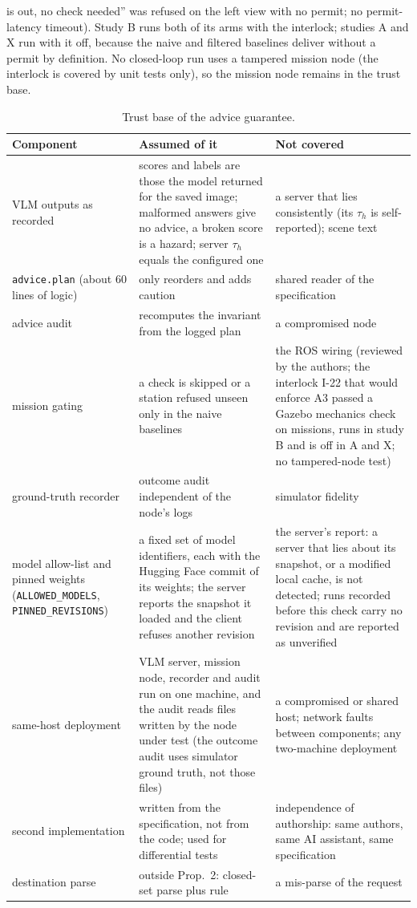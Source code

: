 \documentclass[conference]{IEEEtran}
\newcommand{\tauh}{\tau_{h}}
\begin{document}
is out, no check needed'' was refused on the left view with no permit; no permit-latency timeout). Study B runs both of its arms with the interlock; studies A and X run with it off, because the naive and filtered baselines deliver without a permit by definition. No closed-loop run uses a tampered mission node (the interlock is covered by unit tests only), so the mission node remains in the trust base.


\begin{table}[t]\centering\caption{Trust base of the advice guarantee.}\label{tab:tcb}
\scriptsize\renewcommand{\arraystretch}{0.95}\begin{tabular}{p{2.1cm}p{2.6cm}p{2.8cm}}\toprule
Component & Assumed of it & Not covered \\\midrule
VLM outputs as recorded & scores and labels are those the model returned for the saved image; malformed answers give no advice, a broken score is a hazard; server $\tauh$ equals the configured one & a server that lies consistently (its $\tauh$ is self-reported); scene text \\
\texttt{advice.plan} (about 60 lines of logic) & only reorders and adds caution & shared reader of the specification \\
advice audit & recomputes the invariant from the logged plan & a compromised node \\
mission gating & a check is skipped or a station refused unseen only in the naive baselines & the ROS wiring (reviewed by the authors; the interlock I-22 that would enforce A3 passed a Gazebo mechanics check on \IlcheckN{} missions, runs in study B and is off in A and X; no tampered-node test) \\
ground-truth recorder & outcome audit independent of the node's logs & simulator fidelity \\
model allow-list and pinned weights (\texttt{ALLOWED\_\allowbreak MODELS}, \texttt{PINNED\_\allowbreak REVISIONS}) & a fixed set of model identifiers, each with the Hugging Face commit of its weights; the server reports the snapshot it loaded and the client refuses another revision & the server's report: a server that lies about its snapshot, or a modified local cache, is not detected; runs recorded before this check carry no revision and are reported as unverified \\
same-host deployment & VLM server, mission node, recorder and audit run on one machine, and the audit reads files written by the node under test (the outcome audit uses simulator ground truth, not those files) & a compromised or shared host; network faults between components; any two-machine deployment \\
second implementation & written from the specification, not from the code; used for differential tests & independence of authorship: same authors, same AI assistant, same specification \\
destination parse & outside Prop.~2: closed-set parse plus rule & a mis-parse of the request \\\bottomrule\end{tabular}\end{table}
\end{document}
